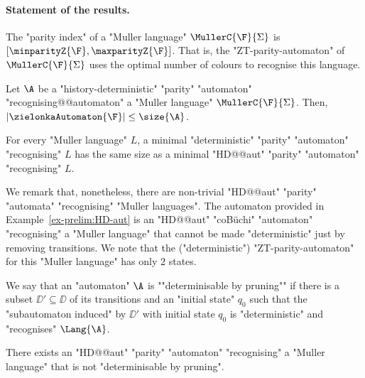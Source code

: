\documentclass[10pt,a4paper]{amsart}
\renewcommand{\SS}{\Sigma}
\begin{document}
\paragraph*{Statement of the results.}
\begin{theorem}\label{thm-zt:optimality_ZTparity-priorities}
	The "parity index" of a "Muller language" $\MullerC{\F}{\SS}$ is $[\minparityZ{\F}, \maxparityZ{\F}]$. That is, the "ZT-parity-automaton" of $\MullerC{\F}{\SS}$ uses the optimal number of colours to recognise this language.
\end{theorem}



\begin{theorem}\label{thm-zt:strong_optimality_ZTparity}
	Let $\A$ be a "history-deterministic" "parity" "automaton" "recognising@@automaton" a "Muller language" $\MullerC{\F}{\SS}$. Then, $|\zielonkaAutomaton{\F}|\leq \size{\A}$.
\end{theorem}

\begin{corollary}\label{cor-zt:no-small-HD-for-Muller}
	For every "Muller language" $L$, a minimal "deterministic" "parity" "automaton" "recognising" $L$ has the same size as a minimal "HD@@aut" "parity" "automaton" "recognising" $L$.
\end{corollary}



\AP We remark that, nonetheless, there are non-trivial "HD@@aut" "parity" "automata" "recognising" "Muller languages". The automaton provided in Example~\ref{ex-prelim:HD-aut} is an "HD@@aut" "coB\"uchi" "automaton" "recognising" a "Muller language" that cannot be made "deterministic" just by removing transitions. We note that the ("deterministic") "ZT-parity-automaton" for this "Muller language" has only $2$ states. 

\AP We say that an "automaton" $\A$ is ""determinisable by pruning"" if there is a subset $\DD'\subseteq \DD$ of its transitions and an "initial state" $q_0$ such that the "subautomaton induced" by $\DD'$ with initial state $q_0$ is "deterministic" and "recognises" $\Lang{\A}$.

\begin{proposition}
	There exists an  "HD@@aut" "parity" "automaton" "recognising" a "Muller language" that is not "determinisable by pruning".
\end{proposition}
\end{document}
